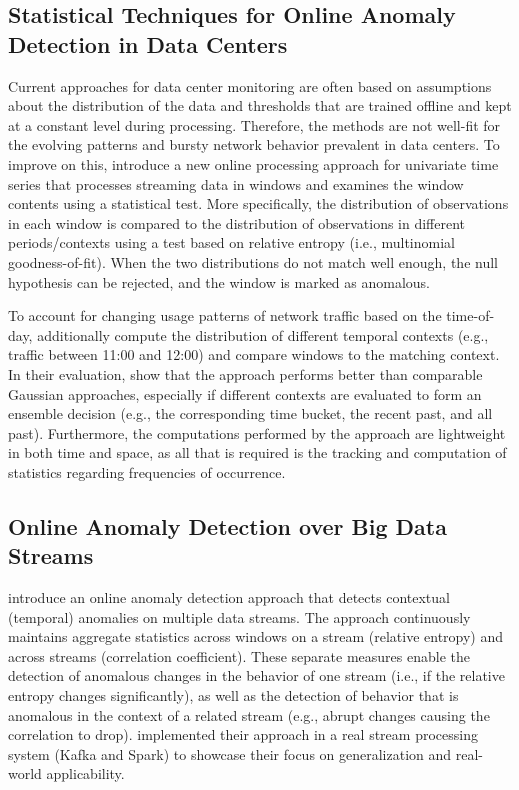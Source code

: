 \subsection{Statistical Techniques for Online Anomaly Detection in Data Centers \citep{wang_statistical_2011}}
Current approaches for data center monitoring are often based on assumptions about the distribution of the data and thresholds that are trained offline and kept at a constant level during processing. Therefore, the methods are not well-fit for the evolving patterns and bursty network behavior prevalent in data centers. To improve on this, \citet{wang_statistical_2011} introduce a new online processing approach for univariate time series that processes streaming data in windows and examines the window contents using a statistical test. More specifically, the distribution of observations in each window is compared to the distribution of observations in different periods/contexts using a test based on relative entropy (i.e., multinomial goodness-of-fit). When the two distributions do not match well enough, the null hypothesis can be rejected, and the window is marked as anomalous.

To account for changing usage patterns of network traffic based on the time-of-day, \citet{wang_statistical_2011} additionally compute the distribution of different temporal contexts (e.g., traffic between 11:00 and 12:00) and compare windows to the matching context. In their evaluation, \citet{wang_statistical_2011} show that the approach performs better than comparable Gaussian approaches, especially if different contexts are evaluated to form an ensemble decision (e.g., the corresponding time bucket, the recent past, and all past). Furthermore, the computations performed by the approach are lightweight in both time and space, as all that is required is the tracking and computation of statistics regarding frequencies of occurrence.


\subsection{Online Anomaly Detection over Big Data Streams \citep{rettig_online_2015}}
\citet{rettig_online_2015} introduce an online anomaly detection approach that detects contextual (temporal) anomalies on multiple data streams. The approach continuously maintains aggregate statistics across windows on a stream (relative entropy) and across streams (correlation coefficient). These separate measures enable the detection of anomalous changes in the behavior of one stream (i.e., if the relative entropy changes significantly), as well as the detection of behavior that is anomalous in the context of a related stream (e.g., abrupt changes causing the correlation to drop). \citet{rettig_online_2015} implemented their approach in a real stream processing system (Kafka and Spark) to showcase their focus on generalization and real-world applicability.

